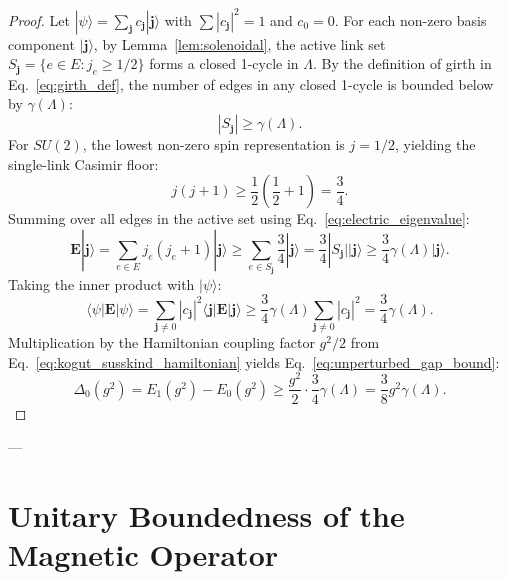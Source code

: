 \documentclass[11pt,reqno]{article}
\begin{document}
\begin{proof}
Let $|\psi\rangle = \sum_{\mathbf{j}} c_{\mathbf{j}} |\mathbf{j}\rangle$ with $\sum |c_{\mathbf{j}}|^2 = 1$ and $c_0 = 0$.
For each non-zero basis component $|\mathbf{j}\rangle$, by Lemma~\ref{lem:solenoidal}, the active link set $S_{\mathbf{j}} = \{e \in E : j_e \ge 1/2\}$ forms a closed 1-cycle in $\Lambda$.
By the definition of girth in Eq.~\eqref{eq:girth_def}, the number of edges in any closed 1-cycle is bounded below by $\gamma(\Lambda)$:
\begin{equation}
    \label{eq:active_set_girth}
    |S_{\mathbf{j}}| \ge \gamma(\Lambda).
\end{equation}
For $SU(2)$, the lowest non-zero spin representation is $j = 1/2$, yielding the single-link Casimir floor:
\begin{equation}
    \label{eq:single_link_floor}
    j(j+1) \ge \frac{1}{2}\left(\frac{1}{2} + 1\right) = \frac{3}{4}.
\end{equation}
Summing over all edges in the active set using Eq.~\eqref{eq:electric_eigenvalue}:
\begin{equation}
    \label{eq:sum_active_casimir}
    \mathbf{E}|\mathbf{j}\rangle = \sum_{e \in E} j_e(j_e + 1) |\mathbf{j}\rangle \ge \sum_{e \in S_{\mathbf{j}}} \frac{3}{4} |\mathbf{j}\rangle = \frac{3}{4} |S_{\mathbf{j}}| |\mathbf{j}\rangle \ge \frac{3}{4} \gamma(\Lambda) |\mathbf{j}\rangle.
\end{equation}
Taking the inner product with $|\psi\rangle$:
\begin{equation}
    \label{eq:inner_product_casimir}
    \langle \psi | \mathbf{E} | \psi \rangle = \sum_{\mathbf{j} \neq 0} |c_{\mathbf{j}}|^2 \langle \mathbf{j} | \mathbf{E} | \mathbf{j} \rangle \ge \frac{3}{4}\gamma(\Lambda) \sum_{\mathbf{j} \neq 0} |c_{\mathbf{j}}|^2 = \frac{3}{4}\gamma(\Lambda).
\end{equation}
Multiplication by the Hamiltonian coupling factor $g^2/2$ from Eq.~\eqref{eq:kogut_susskind_hamiltonian} yields Eq.~\eqref{eq:unperturbed_gap_bound}:
\begin{equation}
    \label{eq:unperturbed_gap_result}
    \Delta_0(g^2) = E_1(g^2) - E_0(g^2) \ge \frac{g^2}{2} \cdot \frac{3}{4}\gamma(\Lambda) = \frac{3}{8} g^2 \gamma(\Lambda).
\end{equation}
\end{proof}

---

\section{Unitary Boundedness of the Magnetic Operator}
\label{sec:magnetic_bound}
\end{document}
